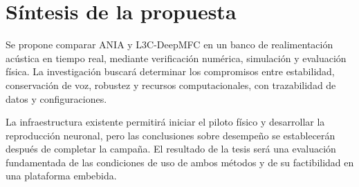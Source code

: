 \section{Síntesis de la propuesta}
Se propone comparar ANIA y L3C-DeepMFC en un banco de realimentación acústica en tiempo real, mediante verificación numérica, simulación y evaluación física. La investigación buscará determinar los compromisos entre estabilidad, conservación de voz, robustez y recursos computacionales, con trazabilidad de datos y configuraciones.

La infraestructura existente permitirá iniciar el piloto físico y desarrollar la reproducción neuronal, pero las conclusiones sobre desempeño se establecerán después de completar la campaña. El resultado de la tesis será una evaluación fundamentada de las condiciones de uso de ambos métodos y de su factibilidad en una plataforma embebida.
